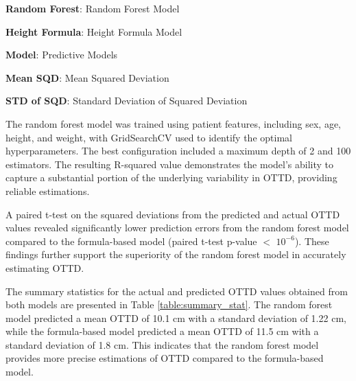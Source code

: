 \documentclass[11pt]{article}
\begin{document}
\begin{table}[h]
\caption{Comparison of prediction performance using Machine Learning model and formula-based model}
\label{table:comp_pred_perf}
\begin{threeparttable}
\renewcommand{\TPTminimum}{\linewidth}
\begin{tablenotes}
\footnotesize
\item \textbf{Random Forest}: Random Forest Model
\item \textbf{Height Formula}: Height Formula Model
\item \textbf{Model}: Predictive Models
\item \textbf{Mean SQD}: Mean Squared Deviation
\item \textbf{STD of SQD}: Standard Deviation of Squared Deviation
\end{tablenotes}
\end{threeparttable}
\end{table}


The random forest model was trained using patient features, including sex, age, height, and weight, with GridSearchCV used to identify the optimal hyperparameters. The best configuration included a maximum depth of 2 and 100 estimators. The resulting R-squared value demonstrates the model's ability to capture a substantial portion of the underlying variability in OTTD, providing reliable estimations.

A paired t-test on the squared deviations from the predicted and actual OTTD values revealed significantly lower prediction errors from the random forest model compared to the formula-based model (paired t-test p-value $<$ $10^{-6}$). These findings further support the superiority of the random forest model in accurately estimating OTTD.

The summary statistics for the actual and predicted OTTD values obtained from both models are presented in Table {}\ref{table:summary_stat}. The random forest model predicted a mean OTTD of 10.1 cm with a standard deviation of 1.22 cm, while the formula-based model predicted a mean OTTD of 11.5 cm with a standard deviation of 1.8 cm. This indicates that the random forest model provides more precise estimations of OTTD compared to the formula-based model.
\end{document}
